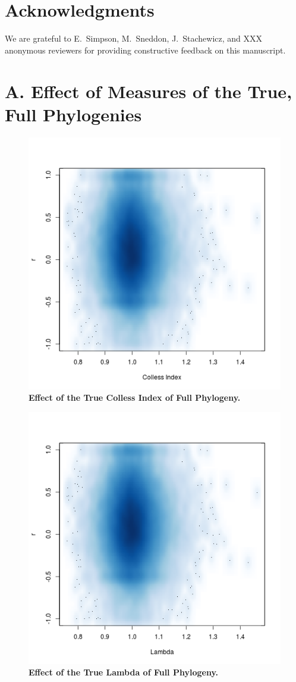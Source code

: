\documentclass[12pt,english]{article}
\begin{document}
\clearpage
\section*{Acknowledgments}
We are grateful to E.\ Simpson, M.\ Sneddon, J.\ Stachewicz, and XXX
anonymous reviewers for providing constructive feedback on this
manuscript.

\clearpage
\printbibliography

\clearpage
\appendix
\section*{A. Effect of Measures of the True, Full Phylogenies}

\begin{figure}[!ht]
  \center
  \includegraphics[width=.5\textwidth]{trueColless.png}
  \caption{\textbf{Effect of the True Colless Index of Full Phylogeny.}}
\end{figure}

\begin{figure}[!ht]
  \center
  \includegraphics[width=.5\textwidth]{trueLambda.png}
  \caption{\textbf{Effect of the True Lambda of Full Phylogeny.}}
\end{figure}
\end{document}
